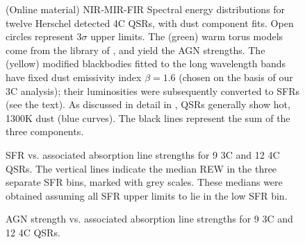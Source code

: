 \documentclass[preprint]{aastex}
\begin{document}
\clearpage

\begin{figure}
 \caption{(Online material) NIR-MIR-FIR Spectral energy distributions for 
 twelve Herschel detected 4C QSRs, with dust component fits. Open circles
 represent 3$\sigma$ upper limits. The (green) warm torus models come from the 
 library of \citet{hoenig10}, and yield the AGN strengths. The (yellow) modified
 blackbodies fitted to the long  wavelength bands have fixed dust emissivity
 index $\beta=1.6$ (chosen on the basis of our 3C analysis); their luminosities
 were subsequently converted to SFRs (see the text). As discussed in detail
 in \citet{podi15}, QSRs generally show hot, 1300K dust (blue curves).
 The black lines represent the sum of the three components.}
\end{figure}

\begin{figure}
 \caption{SFR vs. associated  absorption line strengths for 9 3C
 and 12 4C QSRs. The vertical lines indicate the median REW in the three separate
 SFR bins, marked with grey scales. These medians were obtained assuming all SFR
 upper limits to lie in the low SFR bin.}
\end{figure}

\begin{figure}
 \caption{AGN strength vs. associated  absorption line strengths
 for 9 3C and 12 4C QSRs.}
\end{figure}
\end{document}
